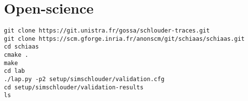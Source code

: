 \documentclass[a4paper,10pt]{article}
\begin{document}
\section{Open-science}

\begin{verbatim}
git clone https://git.unistra.fr/gossa/schlouder-traces.git
git clone https://scm.gforge.inria.fr/anonscm/git/schiaas/schiaas.git 
cd schiaas
cmake .
make
cd lab
./lap.py -p2 setup/simschlouder/validation.cfg
cd setup/simschlouder/validation-results
ls
\end{verbatim}
\end{document}
